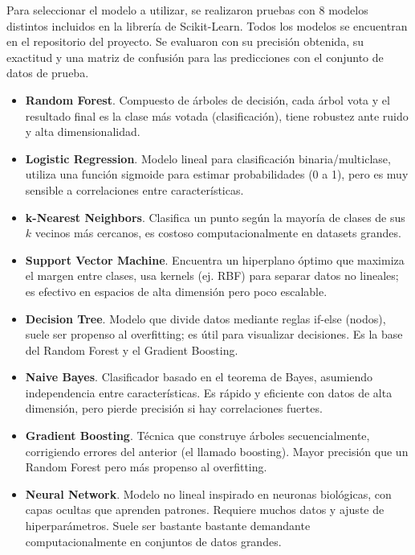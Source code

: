 \documentclass{replab}
\begin{document}
Para seleccionar el modelo a utilizar, se realizaron pruebas con 8 modelos distintos incluidos en la librería de Scikit-Learn. Todos los modelos se encuentran en el repositorio del proyecto. Se evaluaron con su precisión obtenida, su exactitud y una matriz de confusión para las predicciones con el conjunto de datos de prueba.

\begin{itemize}[itemsep=-2pt]
    \item \textbf{Random Forest}. Compuesto de árboles de decisión, cada árbol vota y el resultado final es la clase más votada (clasificación), tiene robustez ante ruido y alta dimensionalidad. \cite{biau}
    \item \textbf{Logistic Regression}. Modelo lineal para clasificación binaria/multiclase, utiliza una función sigmoide para estimar probabilidades (0 a 1), pero es muy sensible a correlaciones entre características. \cite{cramer}
    \item \textbf{k-Nearest Neighbors}. Clasifica un punto según la mayoría de clases de sus $k$ vecinos más cercanos, es costoso computacionalmente en datasets grandes. \cite{cunningham}
    \item \textbf{Support Vector Machine}. Encuentra un hiperplano óptimo que maximiza el margen entre clases, usa kernels (ej. RBF) para separar datos no lineales; es efectivo en espacios de alta dimensión pero poco escalable. \cite{novakovic}
    \item \textbf{Decision Tree}. Modelo que divide datos mediante reglas if-else (nodos), suele ser propenso al overfitting; es útil para visualizar decisiones. Es la base del Random Forest y el Gradient Boosting. \cite{mienye}
    \item \textbf{Naive Bayes}. Clasificador basado en el teorema de Bayes, asumiendo independencia entre características. Es rápido y eficiente con datos de alta dimensión, pero pierde precisión si hay correlaciones fuertes. \cite{vikramkumar}
    \item \textbf{Gradient Boosting}. Técnica que construye árboles secuencialmente, corrigiendo errores del anterior (el llamado boosting). Mayor precisión que un Random Forest pero más propenso al overfitting. \cite{friedman}
    \item \textbf{Neural Network}. Modelo no lineal inspirado en neuronas biológicas, con capas ocultas que aprenden patrones. Requiere muchos datos y ajuste de hiperparámetros. Suele ser bastante bastante demandante computacionalmente en conjuntos de datos grandes. \cite{zhang}
\end{itemize}
\end{document}
